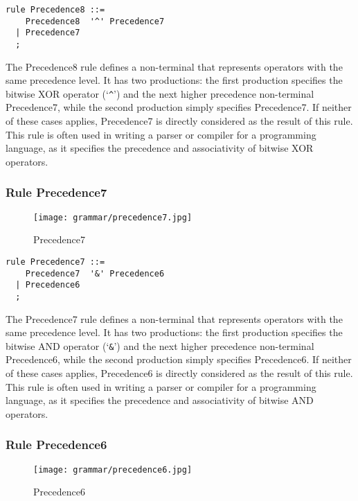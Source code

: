 \begin{lstlisting}
rule Precedence8 ::=
    Precedence8  '^' Precedence7 
  | Precedence7 
  ;
\end{lstlisting}

The Precedence8 rule defines a non-terminal that represents operators with the same precedence level. It has two productions: the first production specifies the bitwise XOR operator (`\verb|^|') and the next higher precedence non-terminal Precedence7, while the second production simply specifies Precedence7. If neither of these cases applies, Precedence7 is directly considered as the result of this rule. This rule is often used in writing a parser or compiler for a programming language, as it specifies the precedence and associativity of bitwise XOR operators.

\subsubsection*{Rule Precedence7}

\begin{figure}[!ht]
\centering
\texttt{[image: grammar/precedence7.jpg]}
\caption{Precedence7}
\end{figure}

\begin{lstlisting}
rule Precedence7 ::=
    Precedence7  '&' Precedence6 
  | Precedence6 
  ;
\end{lstlisting}

The Precedence7 rule defines a non-terminal that represents operators with the same precedence level. It has two productions: the first production specifies the bitwise AND operator (`\verb|&|') and the next higher precedence non-terminal Precedence6, while the second production simply specifies Precedence6. If neither of these cases applies, Precedence6 is directly considered as the result of this rule. This rule is often used in writing a parser or compiler for a programming language, as it specifies the precedence and associativity of bitwise AND operators.

\subsubsection*{Rule Precedence6}

\begin{figure}[!ht]
\centering
\texttt{[image: grammar/precedence6.jpg]}
\caption{Precedence6}
\end{figure}

